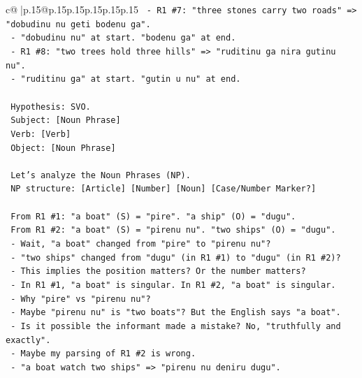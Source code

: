 \documentclass{article}
\begin{document}
{\begin{supertabular}{c@{$\;$}|p{.15\linewidth}@{}p{.15\linewidth}p{.15\linewidth}p{.15\linewidth}p{.15\linewidth}p{.15\linewidth}}
{{{\texttt{                {-} R1 \#7: "three stones carry two roads" => "dobudinu nu geti bodenu ga".} \\
\texttt{                  {-} "dobudinu nu" at start. "bodenu ga" at end.} \\
\texttt{                {-} R1 \#8: "two trees hold three hills" => "ruditinu ga nira gutinu nu".} \\
\texttt{                  {-} "ruditinu ga" at start. "gutin u nu" at end.} \\
\\ 
\texttt{                Hypothesis: SVO.} \\
\texttt{                Subject: {[}Noun Phrase{]}} \\
\texttt{                Verb: {[}Verb{]}} \\
\texttt{                Object: {[}Noun Phrase{]}} \\
\\ 
\texttt{                Let's analyze the Noun Phrases (NP).} \\
\texttt{                NP structure: {[}Article{]} {[}Number{]} {[}Noun{]} {[}Case/Number Marker?{]}} \\
\\ 
\texttt{                From R1 \#1: "a boat" (S) = "pire". "a ship" (O) = "dugu".} \\
\texttt{                From R1 \#2: "a boat" (S) = "pirenu nu". "two ships" (O) = "dugu".} \\
\texttt{                  {-} Wait, "a boat" changed from "pire" to "pirenu nu"?} \\
\texttt{                  {-} "two ships" changed from "dugu" (in R1 \#1) to "dugu" (in R1 \#2)?} \\
\texttt{                  {-} This implies the position matters? Or the number matters?} \\
\texttt{                  {-} In R1 \#1, "a boat" is singular. In R1 \#2, "a boat" is singular.} \\
\texttt{                  {-} Why "pire" vs "pirenu nu"?} \\
\texttt{                  {-} Maybe "pirenu nu" is "two boats"? But the English says "a boat".} \\
\texttt{                  {-} Is it possible the informant made a mistake? No, "truthfully and exactly".} \\
\texttt{                  {-} Maybe my parsing of R1 \#2 is wrong.} \\
\texttt{                  {-} "a boat watch two ships" => "pirenu nu deniru dugu".} \\
}}}
\end{supertabular}}
\end{document}
